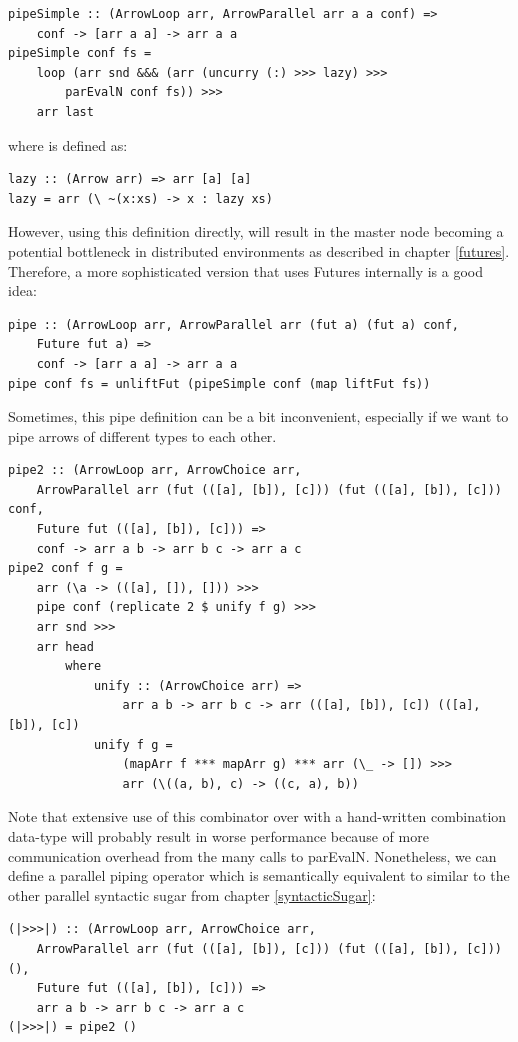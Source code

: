 \begin{lstlisting}[frame=htrbl]
pipeSimple :: (ArrowLoop arr, ArrowParallel arr a a conf) =>
	conf -> [arr a a] -> arr a a
pipeSimple conf fs =
	loop (arr snd &&& (arr (uncurry (:) >>> lazy) >>>
		parEvalN conf fs)) >>>
	arr last
\end{lstlisting}
where  is defined as:
\begin{lstlisting}[frame=htrbl]
lazy :: (Arrow arr) => arr [a] [a]
lazy = arr (\ ~(x:xs) -> x : lazy xs)
\end{lstlisting}
However, using this definition directly, will result in the master node becoming a potential bottleneck in distributed environments as described in chapter \ref{futures}. Therefore, a more sophisticated version that uses Futures internally is a good idea:
\begin{lstlisting}[frame=htrbl]
pipe :: (ArrowLoop arr, ArrowParallel arr (fut a) (fut a) conf,
	Future fut a) =>
	conf -> [arr a a] -> arr a a
pipe conf fs = unliftFut (pipeSimple conf (map liftFut fs))
\end{lstlisting}
Sometimes, this pipe definition can be a bit inconvenient, especially if we want to pipe arrows of different types to each other.
\begin{lstlisting}[frame=htrbl]
pipe2 :: (ArrowLoop arr, ArrowChoice arr,
	ArrowParallel arr (fut (([a], [b]), [c])) (fut (([a], [b]), [c])) conf,
	Future fut (([a], [b]), [c])) =>
	conf -> arr a b -> arr b c -> arr a c
pipe2 conf f g = 
	arr (\a -> (([a], []), [])) >>>
	pipe conf (replicate 2 $ unify f g) >>>
	arr snd >>>
	arr head
		where
			unify :: (ArrowChoice arr) =>
				arr a b -> arr b c -> arr (([a], [b]), [c]) (([a], [b]), [c])
			unify f g =
				(mapArr f *** mapArr g) *** arr (\_ -> []) >>>
				arr (\((a, b), c) -> ((c, a), b))
\end{lstlisting}
Note that extensive use of this combinator over  with a hand-written combination data-type will probably result in worse performance because of more communication overhead from the many calls to parEvalN. Nonetheless, we can define a parallel piping operator \code{|>>>|} which is semantically equivalent to \code{>>>} similar to the other parallel syntactic sugar from chapter \ref{syntacticSugar}:
\begin{lstlisting}[frame=htrbl]
(|>>>|) :: (ArrowLoop arr, ArrowChoice arr,
	ArrowParallel arr (fut (([a], [b]), [c])) (fut (([a], [b]), [c])) (),
	Future fut (([a], [b]), [c])) =>
	arr a b -> arr b c -> arr a c
(|>>>|) = pipe2 ()
\end{lstlisting}

